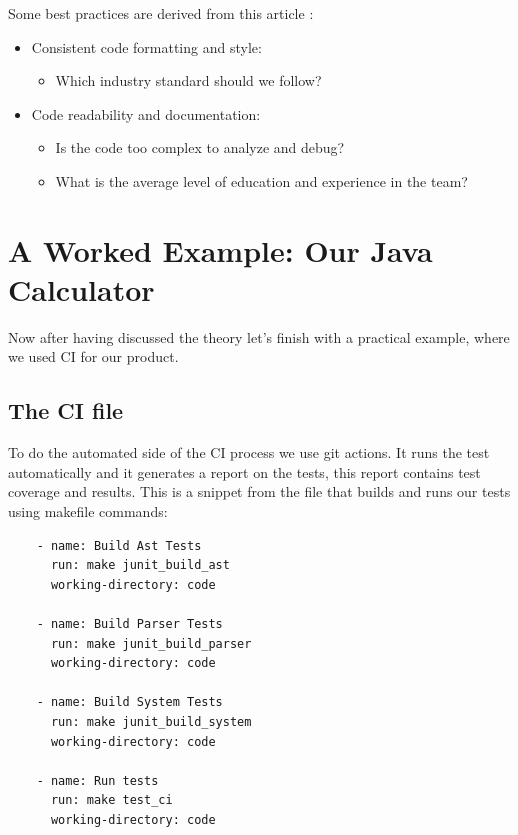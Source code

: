 \documentclass{article}
\begin{document}
Some best practices are derived from this article \cite{noauthor_standards_nodate}:
\begin{itemize}
    \item Consistent code formatting and style:

    \begin{itemize}
        \item Which industry standard should we follow?
    \end{itemize}

    \item Code readability and documentation:

    \begin{itemize}
        \item Is the code too complex to analyze and debug?
        \item What is the average level of education and experience in the team? 
    \end{itemize}

\end{itemize}

\newpage
\section{A Worked Example: Our Java Calculator}

Now after having discussed the theory let's finish with a practical example, where we used CI for our product.

\subsection{The CI file}

To do the automated side of the CI process we use git actions. 
It runs the test automatically and it generates a report on the tests, this report contains test coverage and results.
This is a snippet from the file that builds and runs our tests using makefile commands:

\begin{lstlisting}    
    - name: Build Ast Tests
      run: make junit_build_ast
      working-directory: code
    
    - name: Build Parser Tests
      run: make junit_build_parser
      working-directory: code

    - name: Build System Tests
      run: make junit_build_system
      working-directory: code

    - name: Run tests
      run: make test_ci
      working-directory: code
\end{lstlisting}
\end{document}
